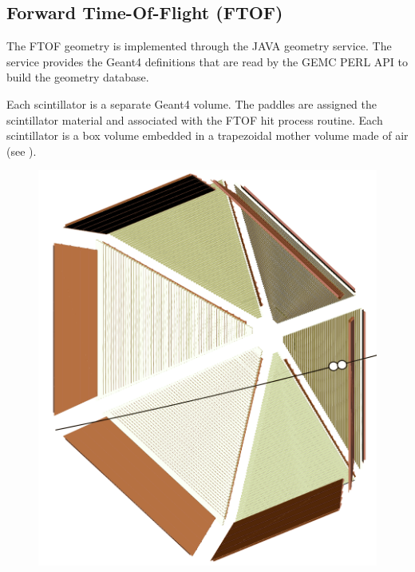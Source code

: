\subsection{Forward Time-Of-Flight (FTOF)}

The FTOF geometry is implemented through the JAVA geometry service. The service provides the Geant4 definitions
that are read by the GEMC PERL API to build the geometry database.

Each scintillator is a separate Geant4 volume. The paddles are assigned the scintillator material and associated with the
FTOF hit process routine. Each scintillator is a box volume embedded in a trapezoidal mother volume made of air (see
).

\begin{figure}
	\centering
	\includegraphics[width=0.99\columnwidth,keepaspectratio]{img/ftofGeometry.png}

\end{figure}
